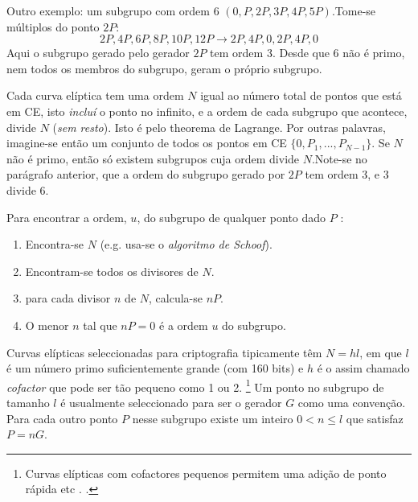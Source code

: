 Outro exemplo: um subgrupo com ordem 6 $(0, P, 2P, 3P, 4P, 5P)$.\newline Tome-se múltiplos do ponto $2P$:\vspace{.175cm}
\[2P, 4P, 6P, 8P, 10P, 12P \rightarrow 2P, 4P, 0, 2P, 4P, 0\]
Aqui o subgrupo gerado pelo gerador $2P$ tem ordem 3. Desde que 6 não é primo, nem todos os membros do subgrupo, geram o próprio subgrupo.

Cada curva elíptica tem uma ordem $N$ igual ao número total de pontos que está em CE,
isto {\em incluí} o ponto no infinito, e a ordem de cada subgrupo que acontece, divide $N$  ({\em sem resto}). Isto é pelo theorema de Lagrange. Por outras palavras, imagine-se então um conjunto de todos os pontos em CE $\{0,P_1,...,P_{N-1}\}$. Se $N$ não é primo, então só existem subgrupos cuja ordem divide $N$.\newline Note-se no parágrafo anterior, que a ordem do subgrupo gerado por $2P$ tem ordem 3, e 3 divide 6.       


Para encontrar a ordem, $u$, do subgrupo de qualquer ponto dado $P$ :
\begin{enumerate}
    \item Encontra-se $N$ (e.g. usa-se o {\em algoritmo de Schoof}).
    \item Encontram-se todos os divisores de $N$.
    \item para cada divisor $n$ de $N$, calcula-se $n P$. 
    \item O menor $n$ tal que $n P = 0$ é a ordem $u$ do subgrupo. 
\end{enumerate} 

Curvas elípticas seleccionadas para criptografia tipicamente têm $N = hl$, em que $l$ é um número primo suficientemente grande (com 160 bits) e $h$ é o assim chamado {\em cofactor} que pode ser tão pequeno como 1 ou 2.
\footnote{Curvas elípticas com cofactores pequenos permitem uma adição de ponto rápida etc . \cite{Bernstein2008}.}
Um ponto no subgrupo de tamanho $l$ é usualmente seleccionado para ser o gerador $G$ como uma convenção. Para cada outro ponto $P$ nesse subgrupo existe um inteiro $0 < n \leq l$ que satisfaz $P = n G$. 

